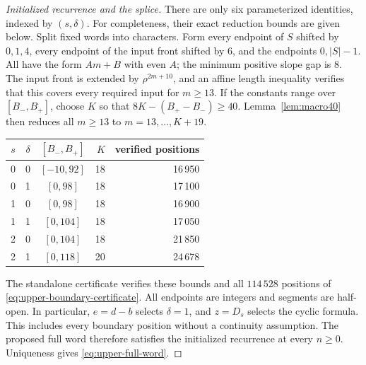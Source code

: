 \documentclass[11pt]{article}
\theoremstyle{remark}\newtheorem{remark}[theorem]{Remark}
\begin{document}
\begin{proof}[Initialized recurrence and the splice]
There are only six parameterized identities, indexed by $(s,\delta)$.
For completeness, their exact reduction bounds are given below.
Split fixed words into characters.  Form every endpoint of $S$ shifted
by $0,1,4$, every endpoint of the input front shifted by $6$, and the
endpoints $0,|S|-1$.  All have the form $Am+B$ with even $A$; the
minimum positive slope gap is $8$.  The input front is extended by
$\rho^{2m+10}$, and an affine length inequality verifies that this
covers every required input for $m\ge13$.  If the constants range
over $[B_-,B_+]$, choose $K$ so that
$8K-(B_+-B_-)\ge40$.  Lemma~\ref{lem:macro40} then reduces all $m\ge13$
to $m=13,\ldots,K+19$.
\begin{center}\small
\begin{tabular}{cccrr}\toprule
$s$&$\delta$&$[B_-,B_+]$&$K$&verified positions\\\midrule
0&0&$[-10,92]$&18&16\,950\\
0&1&$[0,98]$&18&17\,100\\
1&0&$[0,98]$&18&16\,900\\
1&1&$[0,104]$&18&17\,050\\
2&0&$[0,104]$&18&21\,850\\
2&1&$[0,118]$&20&24\,678\\\bottomrule
\end{tabular}
\end{center}
The standalone certificate  verifies
these bounds and all $114\,528$ positions of
\eqref{eq:upper-boundary-certificate}.  All endpoints are integers and
segments are half-open.  In particular, $e=d-b$ selects $\delta=1$,
and $z=D_s$ selects the cyclic formula.  This includes every boundary
position without a continuity assumption.  The proposed full word
therefore satisfies the initialized recurrence at every $n\ge0$.
Uniqueness gives \eqref{eq:upper-full-word}.
\end{proof}
\end{document}
